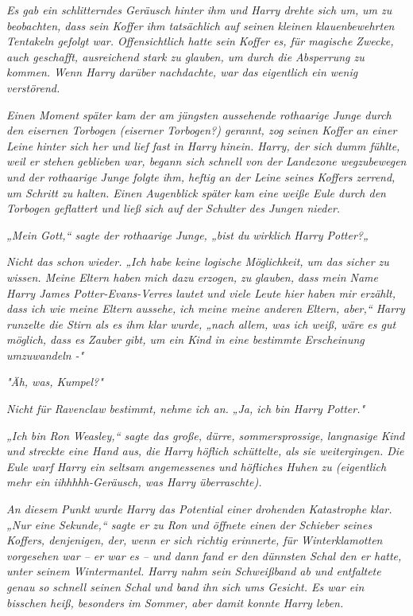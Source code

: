 {\emph{Es gab ein schlitterndes Geräusch hinter ihm und Harry drehte sich um,} \emph{um zu beobachten, dass sein Koffer ihm tatsächlich auf seinen kleinen klauenbewehrten Tentakeln gefolgt war. Offensichtlich hatte sein Koffer es, für magische Zwecke, auch geschafft, ausreichend stark zu glauben, um durch die Absperrung zu kommen. Wenn Harry darüber nachdachte, war das eigentlich ein wenig verstörend.}

\emph{Einen Moment später kam der am jüngsten aussehende rothaarige Junge durch den eisernen Torbogen (eiserner Torbogen?) gerannt, zog seinen Koffer an einer Leine hinter sich her und lief fast in Harry hinein. Harry, der sich dumm fühlte, weil er stehen geblieben war, begann sich schnell von der Landezone wegzubewegen und der rothaarige Junge folgte ihm, heftig an der Leine seines Koffers zerrend, um Schritt zu halten. Einen Augenblick später kam eine weiße Eule durch den Torbogen geflattert und ließ sich auf der Schulter des Jungen nieder.}

\emph{„Mein Gott,“ sagte der rothaarige Junge, „bist du} \emph{\emph{wirklich}} \emph{Harry Potter?„}

\emph{\emph{Nicht das schon wieder.}} \emph{„Ich habe keine logische Möglichkeit, um das sicher zu wissen. Meine Eltern haben mich dazu erzogen, zu} \emph{\emph{glauben,}} \emph{dass mein Name Harry James Potter-Evans-Verres lautet und viele Leute hier haben mir erzählt, dass ich wie meine Eltern} \emph{\emph{aussehe,}} \emph{ich meine meine anderen Eltern, aber,“ Harry runzelte die Stirn als es ihm klar wurde, „nach allem, was ich weiß, wäre es gut möglich, dass es Zauber gibt, um ein Kind in eine bestimmte Erscheinung umzuwandeln -"}

\emph{"Äh, was, Kumpel?"}

\emph{\emph{Nicht für Ravenclaw bestimmt, nehme ich an.}} \emph{„Ja, ich bin Harry Potter."}

\emph{„Ich bin Ron Weasley,“ sagte das große, dürre, sommersprossige, langnasige Kind und streckte eine Hand aus, die Harry höflich schüttelte, als sie weitergingen. Die Eule warf Harry ein seltsam angemessenes und höfliches Huhen zu (eigentlich mehr ein iihhhhh-Geräusch, was Harry überraschte).}

\emph{An diesem Punkt wurde Harry das Potential einer drohenden Katastrophe klar. „Nur eine Sekunde,“ sagte er zu Ron und öffnete einen der Schieber seines Koffers, denjenigen, der, wenn er sich richtig erinnerte, für Winterklamotten vorgesehen war -- er war es -- und dann fand er den dünnsten Schal den er hatte, unter seinem Wintermantel. Harry nahm sein Schweißband ab und entfaltete genau so schnell seinen Schal und band ihn sich ums Gesicht. Es war ein bisschen heiß, besonders im Sommer, aber damit konnte Harry leben.}

}
